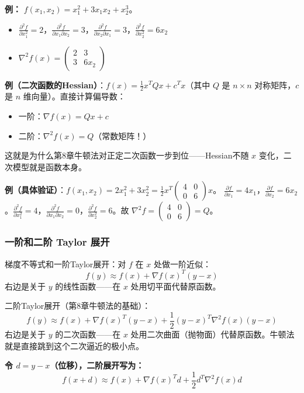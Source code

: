 \textbf{例：} $f(x_1,x_2)=x_1^2+3x_1x_2+x_2^3$。
\begin{itemize}
  \item $\frac{\partial^2 f}{\partial x_1^2}=2$，$\frac{\partial^2 f}{\partial x_1\partial x_2}=3$，$\frac{\partial^2 f}{\partial x_2\partial x_1}=3$，$\frac{\partial^2 f}{\partial x_2^2}=6x_2$
  \item $\nabla^2 f(x)=\begin{pmatrix}2&3\\3&6x_2\end{pmatrix}$
\end{itemize}

\textbf{例（二次函数的Hessian）}：$f(x)=\frac12 x^T Q x + c^T x$（其中 $Q$ 是 $n\times n$ 对称矩阵，$c$ 是 $n$ 维向量）。直接计算偏导数：
\begin{itemize}
  \item 一阶：$\nabla f(x)=Qx+c$
  \item 二阶：$\nabla^2 f(x)=Q$（常数矩阵！）
\end{itemize}
这就是为什么第8章牛顿法对正定二次函数一步到位——Hessian不随 $x$ 变化，二次模型就是函数本身。

\textbf{例（具体验证）}：$f(x_1,x_2)=2x_1^2+3x_2^2=\frac12 x^T\begin{pmatrix}4&0\\0&6\end{pmatrix}x$。
$\frac{\partial f}{\partial x_1}=4x_1$，$\frac{\partial f}{\partial x_2}=6x_2$。$\frac{\partial^2 f}{\partial x_1^2}=4$，$\frac{\partial^2 f}{\partial x_1\partial x_2}=0$，$\frac{\partial^2 f}{\partial x_2^2}=6$。故 $\nabla^2 f=\begin{pmatrix}4&0\\0&6\end{pmatrix}=Q$。\checkmark

\subsubsection{一阶和二阶 Taylor 展开}

梯度不等式和一阶Taylor展开：对 $f$ 在 $x$ 处做一阶近似：
\[
f(y) \approx f(x) + \nabla f(x)^T(y-x)
\]
右边是关于 $y$ 的线性函数——在 $x$ 处用切平面代替原函数。

二阶Taylor展开（第8章牛顿法的基础）：
\[
f(y) \approx f(x) + \nabla f(x)^T(y-x) + \frac{1}{2}(y-x)^T \nabla^2 f(x) (y-x)
\]
右边是关于 $y$ 的二次函数——在 $x$ 处用二次曲面（抛物面）代替原函数。牛顿法就是直接跳到这个二次逼近的极小点。

\textbf{令 $d=y-x$（位移），二阶展开写为：}
\[
f(x+d) \approx f(x) + \nabla f(x)^T d + \frac{1}{2} d^T \nabla^2 f(x) d
\]

